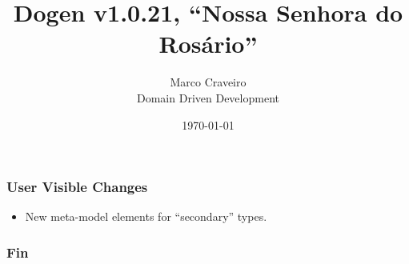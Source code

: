 \documentclass{beamer}
\title{Dogen v1.0.21, \enquote{Nossa Senhora do Rosário}}
\author{Marco Craveiro \\
  Domain Driven Development
}
\date{\today}
\begin{document}
\begin{frame}
\titlepage{}
\end{frame}

\begin{frame}
\frametitle{User Visible Changes}

\begin{itemize}
  \pause{}
\item New meta-model elements for \enquote{secondary} types.
  \pause{}
\end{itemize}

\end{frame}

\begin{frame}
\frametitle{Fin}
\end{frame}
\end{document}
